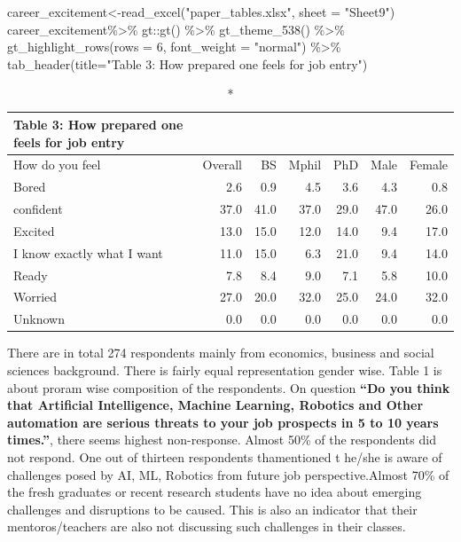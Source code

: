 \documentclass[
]{aft}
\newenvironment{Shaded}{\begin{snugshade}}{\end{snugshade}}
\newcommand{\AttributeTok}[1]{\textcolor[rgb]{0.40,0.45,0.13}{#1}}
\newcommand{\DecValTok}[1]{\textcolor[rgb]{0.68,0.00,0.00}{#1}}
\newcommand{\FunctionTok}[1]{\textcolor[rgb]{0.28,0.35,0.67}{#1}}
\newcommand{\NormalTok}[1]{\textcolor[rgb]{0.00,0.23,0.31}{#1}}
\newcommand{\OtherTok}[1]{\textcolor[rgb]{0.00,0.23,0.31}{#1}}
\newcommand{\SpecialCharTok}[1]{\textcolor[rgb]{0.37,0.37,0.37}{#1}}
\newcommand{\StringTok}[1]{\textcolor[rgb]{0.13,0.47,0.30}{#1}}
\begin{document}
\begin{Shaded}
\begin{Highlighting}[]
\NormalTok{career\_excitement}\OtherTok{\textless{}{-}}\FunctionTok{read\_excel}\NormalTok{(}\StringTok{"paper\_tables.xlsx"}\NormalTok{,   }\AttributeTok{sheet =} \StringTok{"Sheet9"}\NormalTok{)}
\NormalTok{career\_excitement}\SpecialCharTok{\%\textgreater{}\%}\NormalTok{ gt}\SpecialCharTok{::}\FunctionTok{gt}\NormalTok{() }\SpecialCharTok{\%\textgreater{}\%} 
  \FunctionTok{gt\_theme\_538}\NormalTok{() }\SpecialCharTok{\%\textgreater{}\%}
  \FunctionTok{gt\_highlight\_rows}\NormalTok{(}\AttributeTok{rows =} \DecValTok{6}\NormalTok{, }\AttributeTok{font\_weight =} \StringTok{"normal"}\NormalTok{) }\SpecialCharTok{\%\textgreater{}\%} 
  \FunctionTok{tab\_header}\NormalTok{(}\AttributeTok{title=}\StringTok{"Table 3: How prepared one feels for job entry"}\NormalTok{)}
\end{Highlighting}
\end{Shaded}

\captionsetup[table]{labelformat=empty,skip=1pt}
\begin{longtable}{lrrrrrr}
\caption*{
{\large Table 3: How prepared one feels for job entry}
} \\ 
\toprule
How do you feel & Overall & BS & Mphil & PhD & Male & Female \\ 
\midrule
Bored & 2.6 & 0.9 & 4.5 & 3.6 & 4.3 & 0.8 \\ 
confident & 37.0 & 41.0 & 37.0 & 29.0 & 47.0 & 26.0 \\ 
Excited & 13.0 & 15.0 & 12.0 & 14.0 & 9.4 & 17.0 \\ 
I know exactly what I want & 11.0 & 15.0 & 6.3 & 21.0 & 9.4 & 14.0 \\ 
Ready & 7.8 & 8.4 & 9.0 & 7.1 & 5.8 & 10.0 \\ 
Worried & 27.0 & 20.0 & 32.0 & 25.0 & 24.0 & 32.0 \\ 
Unknown & 0.0 & 0.0 & 0.0 & 0.0 & 0.0 & 0.0 \\ 
\bottomrule
\end{longtable}

There are in total 274 respondents mainly from economics, business and
social sciences background. There is fairly equal representation gender
wise. Table 1 is about proram wise composition of the respondents. On
question \textbf{``Do you think that Artificial Intelligence, Machine
Learning, Robotics and Other automation are serious threats to your job
prospects in 5 to 10 years times.''}, there seems highest non-response.
Almost 50\% of the respondents did not respond. One out of thirteen
respondents thamentioned t he/she is aware of challenges posed by AI,
ML, Robotics from future job perspective.Almost 70\% of the fresh
graduates or recent research students have no idea about emerging
challenges and disruptions to be caused. This is also an indicator that
their mentoros/teachers are also not discussing such challenges in their
classes.
\end{document}
